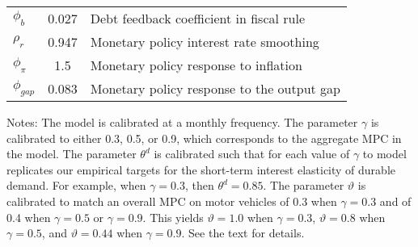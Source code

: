 \begin{table}[htbp]
\begin{tabular}{lS[table-format=2.3]l}
$\phi_b$ & 0.027 & Debt feedback coefficient in fiscal rule\\ 
$\rho_{r}$ & 0.947 & Monetary policy interest rate smoothing\\ 
$\phi_{\pi}$ & 1.5 & Monetary policy response to inflation\\ 
$\phi_{gap}$ & 0.083 & Monetary policy response to the output gap\\ 
\bottomrule\end{tabular}
\begin{minipage}{\hsize} \rule{0pt}{9pt} \footnotesize 
Notes: The model is calibrated at a monthly frequency. The parameter $\gamma$ is calibrated to either 0.3, 0.5, or 0.9, which corresponds to the aggregate MPC in the model. The parameter $\theta^d$ is calibrated such that for each value of $\gamma$ to model replicates our empirical targets for the short-term interest elasticity of durable demand. For example, when $\gamma=0.3$, then $\theta^d=0.85$. The parameter $\vartheta$ is calibrated  to match an overall MPC on motor vehicles of 0.3 when $\gamma=0.3$ and of 0.4 when $\gamma=0.5$ or $\gamma=0.9$. This yields  $\vartheta=1.0$ when $\gamma=0.3$,  $\vartheta=0.8$ when $\gamma=0.5$, and  $\vartheta=0.44$ when $\gamma=0.9$. See the text for details. \end{minipage}
\label{tab:calibration}
\end{table}
